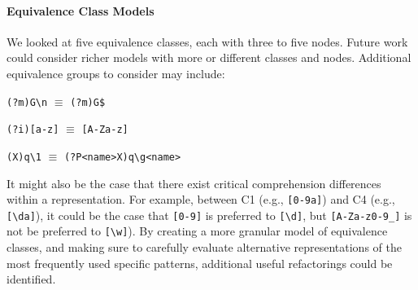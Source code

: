 \paragraph{Equivalence Class Models}
We looked at five equivalence classes, each with three to five nodes.
Future work could consider richer models with more or different classes and nodes.
%
Additional equivalence groups to consider may include:
\begin{description} \itemsep -2pt
\item[Multi line option]  \verb!(?m)G\n! $\equiv$ \verb!(?m)G$!
\item[Case insensitive]  \verb!(?i)[a-z]! $\equiv$ \verb![A-Za-z]!
\item[Backreferences]  \verb!(X)q\1! $\equiv$ \verb!(?P<name>X)q\g<name>!
\end{description}



It might also be the case that there exist critical comprehension differences within a representation. For example, between C1 (e.g., \verb![0-9a]!) and C4 (e.g., \verb![\da]!), it could be the case that \verb![0-9]! is preferred to \verb![\d]!, but \verb![A-Za-z0-9_]! is not be preferred to \verb![\w]!).
By creating a more granular model of equivalence classes, and making sure to carefully evaluate alternative representations of the most frequently used specific patterns,  additional useful refactorings could be identified.



